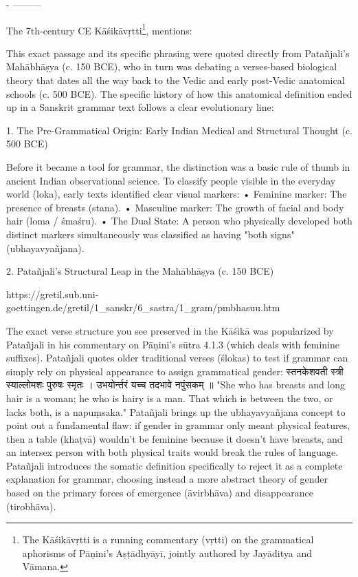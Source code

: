 - ---------

The 7th-century CE Kāśikāvṛtti\footnote{The Kāśikāvṛtti is a running commentary (vṛtti) on the grammatical aphorisms of Pāṇini's Aṣṭādhyāyī, jointly authored by Jayāditya and Vāmana. }, mentions:



This exact passage and its specific phrasing were quoted directly from Patañjali’s Mahābhāṣya (c. 150 BCE), who in turn was debating a verses-based biological theory that dates all the way back to the Vedic and early post-Vedic anatomical schools (c. 500 BCE).
The specific history of how this anatomical definition ended up in a Sanskrit grammar text follows a clear evolutionary line:

1. The Pre-Grammatical Origin: Early Indian Medical and Structural Thought (c. 500 BCE)

Before it became a tool for grammar, the distinction was a basic rule of thumb in ancient Indian observational science. To classify people visible in the everyday world (loka), early texts identified clear visual markers:
• Feminine marker: The presence of breasts (stana).
• Masculine marker: The growth of facial and body hair (loma / śmaśru).
• The Dual State: A person who physically developed both distinct markers simultaneously was classified as having "both signs" (ubhayavyañjana).

2. Patañjali’s Structural Leap in the Mahābhāṣya (c. 150 BCE)

https://gretil.sub.uni-goettingen.de/gretil/1_sanskr/6_sastra/1_gram/pmbhasuu.htm

The exact verse structure you see preserved in the Kāśikā was popularized by Patañjali in his commentary on Pāṇini's sūtra 4.1.3 (which deals with feminine suffixes). Patañjali quotes older traditional verses (ślokas) to test if grammar can simply rely on physical appearance to assign grammatical gender:
स्तनकेशवती स्त्री स्याल्लोमशः पुरुषः स्मृतः । उभयोर्न्तरं यच्च तदभावे नपुंसकम् ॥
"She who has breasts and long hair is a woman; he who is hairy is a man. That which is between the two, or lacks both, is a napuṃsaka."
Patañjali brings up the ubhayavyañjana concept to point out a fundamental flaw: if gender in grammar only meant physical features, then a table (khaṭvā) wouldn't be feminine because it doesn't have breasts, and an intersex person with both physical traits would break the rules of language. Patañjali introduces the somatic definition specifically to reject it as a complete explanation for grammar, choosing instead a more abstract theory of gender based on the primary forces of emergence (āvirbhāva) and disappearance (tirobhāva).






